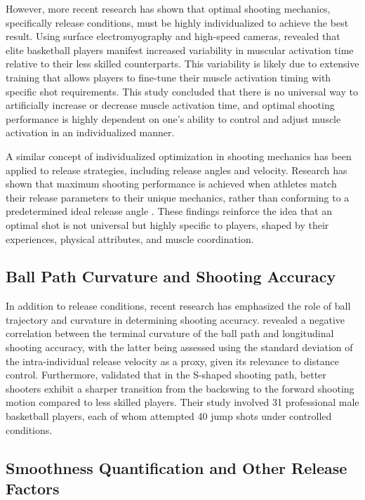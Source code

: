 \documentclass{article}
\begin{document}
      However, more recent research has shown that optimal shooting mechanics, specifically release conditions, must be highly individualized to achieve the best result. Using surface electromyography and high-speed cameras, \citet{pakosz_muscle_2021} revealed that elite basketball players manifest increased variability in muscular activation time relative to their less skilled counterparts. This variability is likely due to extensive training that allows players to fine-tune their muscle activation timing with specific shot requirements. This study concluded that there is no universal way to artificially increase or decrease muscle activation time, and optimal shooting performance is highly dependent on one's ability to control and adjust muscle activation in an individualized manner. 

      A similar concept of individualized optimization in shooting mechanics has been applied to release strategies, including release angles and velocity. Research has shown that maximum shooting performance is achieved when athletes match their release parameters to their unique mechanics, rather than conforming to a predetermined ideal release angle \citep{slegers_basketball_2022}. These findings reinforce the idea that an optimal shot is not universal but highly specific to players, shaped by their experiences, physical attributes, and muscle coordination. 

    \subsection{Ball Path Curvature and Shooting Accuracy}
    
      In addition to release conditions, recent research has emphasized the role of ball trajectory and curvature in determining shooting accuracy. \citet{slegers_role_2024} revealed a negative correlation between the terminal curvature of the ball path and longitudinal shooting accuracy, with the latter being assessed using the standard deviation of the intra-individual release velocity as a proxy, given its relevance to distance control. Furthermore, \citet{slegers_role_2024} validated that in the S-shaped shooting path, better shooters exhibit a sharper transition from the backswing to the forward shooting motion compared to less skilled players. Their study involved 31 professional male basketball players, each of whom attempted 40 jump shots under controlled conditions. 

    \subsection{Smoothness Quantification and Other Release Factors}
\end{document}
